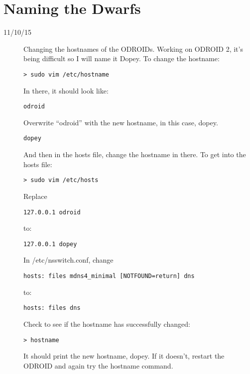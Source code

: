 \section{Naming the Dwarfs}
\begin{description}
\item[11/10/15] Changing the hostnames of the ODROIDs. Working on ODROID 2, it's being difficult so I will name it Dopey. To change the hostname:
\begin{lstlisting}
> sudo vim /etc/hostname
\end{lstlisting}
In there, it should look like:
\begin{lstlisting}
odroid
\end{lstlisting}
Overwrite ``odroid'' with the new hostname, in this case, dopey.
\begin{lstlisting}
dopey
\end{lstlisting}
And then in the hosts file, change the hostname in there. To get into the hosts file:
\begin{lstlisting}
> sudo vim /etc/hosts
\end{lstlisting}
Replace 
\begin{lstlisting}
127.0.0.1 odroid
\end{lstlisting} 
to:
\begin{lstlisting}
127.0.0.1 dopey
\end{lstlisting}
In /etc/nsswitch.conf, change
\begin{lstlisting}
hosts: files mdns4_minimal [NOTFOUND=return] dns
\end{lstlisting}
to:
\begin{lstlisting}
hosts: files dns
\end{lstlisting}
Check to see if the hostname has successfully changed:
\begin{lstlisting}
> hostname
\end{lstlisting}
It should print the new hostname, dopey. If it doesn't, restart the ODROID and again try the hostname command.
\end{description}

